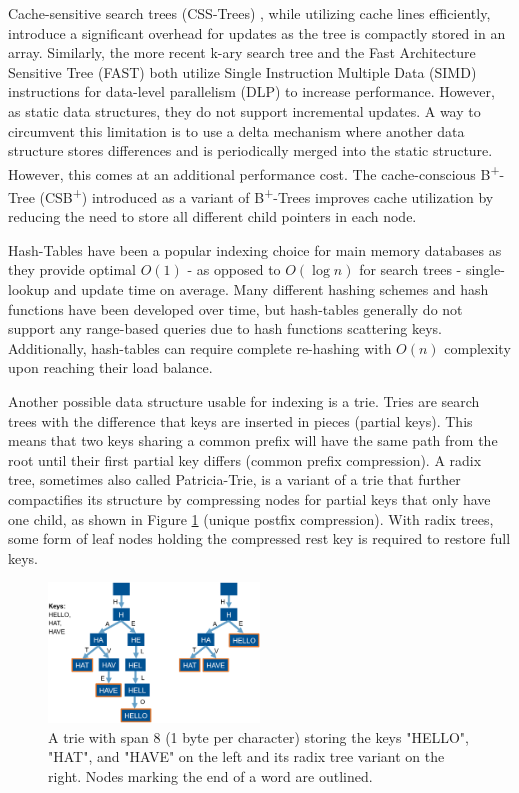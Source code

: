 \documentclass[acmtog, nonacm]{acmart}
\begin{document}
Cache-sensitive search trees (CSS-Trees) \cite{rao1998cache}, while utilizing cache lines efficiently, 
introduce a significant overhead for updates as the tree is compactly stored in an array. 
Similarly, the more recent k-ary search tree \cite{10.1145/1565694.1565705} and the Fast Architecture 
Sensitive Tree (FAST) \cite{10.1145/1807167.1807206} both utilize Single Instruction Multiple Data (SIMD) 
instructions for data-level parallelism (DLP) to increase performance. However, as static data 
structures, they do not support incremental updates. A way to circumvent this limitation is to 
use a delta mechanism where another data structure stores differences and is periodically merged 
into the static structure. However, this comes at an additional performance cost. The cache-conscious 
B\textsuperscript{+}-Tree (CSB\textsuperscript{+}) \cite{10.1145/342009.335449} introduced as a variant of 
B\textsuperscript{+}-Trees improves cache utilization by reducing the need to store all different 
child pointers in each node.

Hash-Tables have been a popular indexing choice for main memory databases as they provide 
optimal $O(1)$ - as opposed to $O(\log n)$ for search trees - single-lookup and update 
time on average. Many different hashing schemes and hash functions have been developed 
over time, but hash-tables generally do not support any range-based queries due to hash functions scattering keys. Additionally, hash-tables can require complete re-hashing with $O(n)$ complexity 
upon reaching their load balance.

Another possible data structure usable for indexing is a trie. Tries are search trees 
with the difference that keys are inserted in pieces (partial keys). This means that two keys sharing a common
prefix will have the same path from the root until their first partial key differs (common prefix compression). A radix tree, 
sometimes also called Patricia-Trie, is a variant of
a trie that further compactifies its structure by compressing nodes for partial keys that only have one child, as 
shown in Figure \ref{fig:trie} (unique postfix compression). With radix trees, some form of leaf nodes holding the compressed rest key is required 
to restore full keys.

\begin{figure}
    \centering
    \includegraphics[width=0.5\textwidth]{images/01-trie-radix-tree-example.PNG}
    \caption{A trie with span 8 (1 byte per character) storing the keys "HELLO", "HAT", and "HAVE" on the left and its radix tree variant on the right. Nodes marking the end of a word are outlined.}
    \label{fig:trie}
\end{figure}
\end{document}

